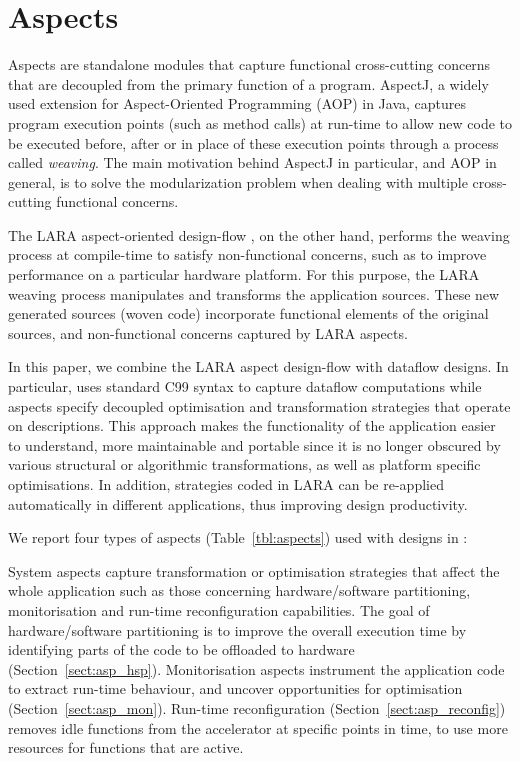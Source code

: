 \section{Aspects}
\label{sec:aspects}

Aspects are standalone modules that capture functional cross-cutting
concerns that are decoupled from the primary function of a
program. AspectJ\cite{Kiczales:2005:AP:1062455.1062640}, a widely
used extension for Aspect-Oriented Programming (AOP) in Java, captures
program execution points (such as method calls) at run-time to allow
new code to be executed before, after or in place of these execution
points through a process called \emph{weaving}. The main motivation
behind AspectJ in particular, and AOP in general, is to solve the
modularization problem when dealing with multiple cross-cutting
functional concerns.

The LARA aspect-oriented
design-flow \cite{Cardoso:Carvalho:Cutinho:Luk:Nobre:Diniz:Petrov:2012},
on the other hand, performs the weaving process at compile-time to
satisfy non-functional concerns, such as to improve performance on a
particular hardware platform. For this purpose, the LARA weaving
process manipulates and transforms the application sources. These new
generated sources (woven code) incorporate functional elements of the
original sources, and non-functional concerns captured by LARA
aspects.

In this paper, we combine the LARA aspect design-flow with \MAXC{}
dataflow designs. In particular, \MAXC{} uses standard C99 syntax to
capture dataflow computations while aspects specify decoupled
optimisation and transformation strategies that operate on \MAXC{}
descriptions. This approach makes the functionality of the application
easier to understand, more maintainable and portable since it is no
longer obscured by various structural or algorithmic transformations,
as well as platform specific optimisations. In addition, strategies
coded in LARA can be re-applied automatically in different
applications, thus improving design productivity.

We report four types of aspects (Table~\ref{tbl:aspects}) used with
designs in \MAXC{}:

\vspace*{0.5ex}
 System aspects capture transformation
or optimisation strategies that affect the whole application such as
those concerning hardware/software partitioning, monitorisation and
run-time reconfiguration capabilities. The goal of hardware/software
partitioning is to improve the overall execution time by identifying
parts of the code to be offloaded to hardware
(Section~\ref{sect:asp_hsp}). Monitorisation aspects instrument the
application code to extract run-time behaviour, and uncover
opportunities for optimisation (Section~\ref{sect:asp_mon}). Run-time
reconfiguration (Section~\ref{sect:asp_reconfig}) removes idle
functions from the accelerator at specific points in time, to use more
resources for functions that are active.

